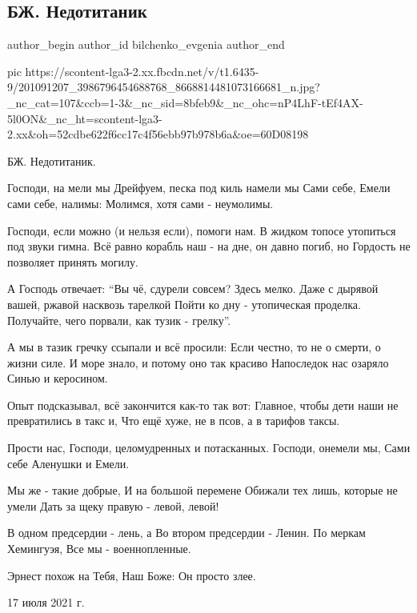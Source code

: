  
 
 
 
 
 
\subsection{БЖ. Недотитаник}
\label{sec:17_06_2021.fb.bilchenko_evgenia.2.nedotitanik}
\ifcmt
 author_begin
   author_id bilchenko_evgenia
 author_end
\fi

\ifcmt
  pic https://scontent-lga3-2.xx.fbcdn.net/v/t1.6435-9/201091207_3986796454688768_8668814481073166681_n.jpg?_nc_cat=107&ccb=1-3&_nc_sid=8bfeb9&_nc_ohc=nP4LhF-tEf4AX-5l0ON&_nc_ht=scontent-lga3-2.xx&oh=52cdbe622f6cc17c4f56ebb97b978b6a&oe=60D08198
\fi

БЖ. Недотитаник.

Господи, на мели мы 
Дрейфуем, песка под киль намели мы
Сами себе, Емели сами себе, налимы:
Молимся, хотя сами - неумолимы.

Господи, если можно (и нельзя если), помоги нам.
В жидком топосе утопиться под звуки гимна.
Всё равно корабль наш - на дне, он давно погиб, но
Гордость не позволяет принять могилу.

А Господь отвечает: \enquote{Вы чё, сдурели совсем? Здесь мелко.
Даже с дырявой вашей, ржавой насквозь тарелкой
Пойти ко дну - утопическая проделка.
Получайте, чего порвали, как тузик - грелку}.

А мы в тазик гречку ссыпали и всё просили:
Если честно, то не о смерти, о жизни силе.
И море знало, и потому оно так красиво
Напоследок нас озаряло
Синью и керосином.

Опыт подсказывал, всё закончится как-то так вот:
Главное, чтобы дети наши не превратились в такс и,
Что ещё хуже, не в псов, а в тарифов таксы.

Прости нас, Господи, целомудренных и потасканных.
Господи, онемели мы,
Сами себе Аленушки и Емели.

Мы же - такие добрые,
И на большой перемене
Обижали тех лишь, которые не умели
Дать за щеку правую - левой, левой!

В одном предсердии - лень, а
Во втором предсердии - Ленин.
По меркам Хемингуэя, 
Все мы - военнопленные.

Эрнест похож на Тебя, Наш Боже:
Он просто злее.

17 июля 2021 г.

